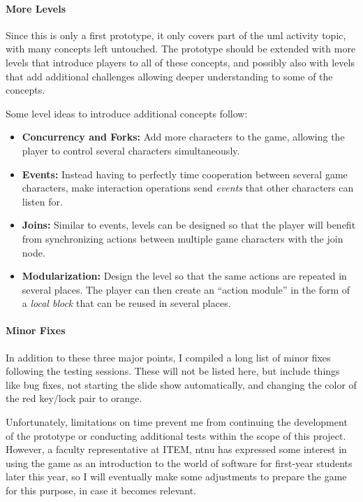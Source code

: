 \paragraph{More Levels} Since this is only a first prototype, it only covers part of the \gls{uml} activity topic, with many concepts left untouched. The prototype should be extended with more levels that introduce players to all of these concepts, and possibly also with levels that add additional challenges allowing deeper understanding to some of the concepts.

\noindent
Some level ideas to introduce additional concepts follow:
\begin{itemize}
	\item{\textbf{Concurrency and Forks:}} Add more characters to the game, allowing the player to control several characters simultaneously.
	\item{\textbf{Events:}} Instead having to perfectly time cooperation between several game characters, make interaction operations send \emph{events} that other characters can listen for.
	\item{\textbf{Joins:}} Similar to events, levels can be designed so that the player will benefit from synchronizing actions between multiple game characters with the join node.
	\item{\textbf{Modularization:}} Design the level so that the same actions are repeated in several places. The player can then create an ``action module'' in the form of a \emph{local block} that can be reused in several places.
\end{itemize}

\paragraph{Minor Fixes} In addition to these three major points, I compiled a long list of minor fixes following the testing sessions. These will not be listed here, but include things like bug fixes, not starting the slide show automatically, and changing the color of the red key/lock pair to orange.

\noindent
Unfortunately, limitations on time prevent me from continuing the development of the prototype or conducting additional tests within the scope of this project. However, a faculty representative at ITEM, \gls{ntnu} has expressed some interest in using the game as an introduction to the world of software for first-year students later this year, so I will eventually make some adjustments to prepare the game for this purpose, in case it becomes relevant.
